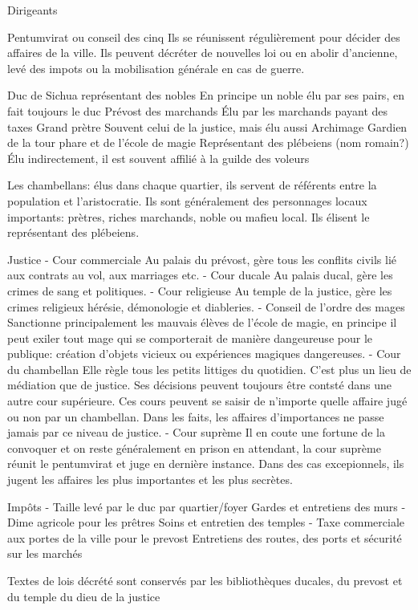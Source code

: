 Dirigeants

   Pentumvirat ou conseil des cinq
       Ils se réunissent régulièrement pour décider des affaires de la 
       ville. Ils peuvent décréter de nouvelles loi ou en abolir d'ancienne,
       levé des impots ou la mobilisation générale en cas de guerre.

   Duc de Sichua représentant des nobles
       En principe un noble élu par ses pairs, en fait toujours le duc
   Prévost des marchands
       Élu par les marchands payant des taxes
   Grand prètre 
       Souvent celui de la justice, mais élu aussi
   Archimage
       Gardien de la tour phare et de l'école de magie
   Représentant des plébeiens (nom romain?) 
       Élu indirectement, il est souvent affilié à la guilde des voleurs

   Les chambellans: élus dans chaque quartier, ils servent de référents
       entre la population et l'aristocratie. Ils sont généralement des
       personnages locaux importants: prètres, riches marchands, noble
       ou mafieu local. Ils élisent le représentant des plébeiens.

Justice
 - Cour commerciale
     Au palais du prévost, gère tous les conflits civils lié aux contrats
     au vol, aux marriages etc.
 - Cour ducale
     Au palais ducal, gère les crimes de sang et politiques.
 - Cour religieuse
     Au temple de la justice, gère les crimes religieux hérésie, démonologie
     et diableries.
 - Conseil de l'ordre des mages
     Sanctionne principalement les mauvais élèves de l'école de magie, en
     principe il peut exiler tout mage qui se comporterait de manière 
     dangeureuse pour le publique: création d'objets vicieux ou expériences 
     magiques dangereuses.
 - Cour du chambellan 
     Elle règle tous les petits littiges du quotidien. C'est 
     plus un lieu de médiation que de justice. Ses décisions peuvent
     toujours être contsté dans une autre cour supérieure. Ces cours peuvent
     se saisir de n'importe quelle affaire jugé ou non par un chambellan.
     Dans les faits, les affaires d'importances ne passe jamais par ce 
     niveau de justice.
 - Cour suprème
     Il en coute une fortune de la convoquer et on reste généralement en 
     prison en attendant, la cour suprème réunit le pentumvirat et juge
     en dernière instance. Dans des cas excepionnels, ils jugent les 
     affaires les plus importantes et les plus secrètes.

Impôts
 - Taille levé par le duc par quartier/foyer
     Gardes et entretiens des murs
 - Dime agricole pour les prêtres
     Soins et entretien des temples
 - Taxe commerciale aux portes de la ville pour le prevost
     Entretiens des routes, des ports et sécurité sur les marchés

Textes de lois décrété sont conservés par les bibliothèques ducales, 
du prevost et du temple du dieu de la justice
